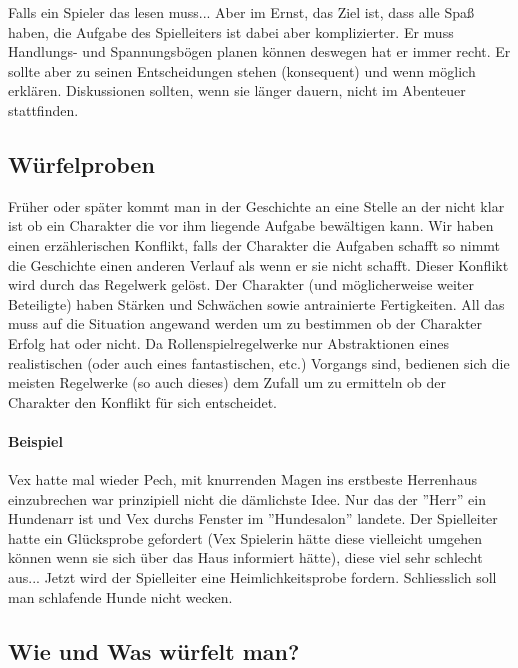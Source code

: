 \documentclass{article}
\begin{document}
Falls ein Spieler das lesen muss... Aber im Ernst, das Ziel ist, dass alle Spaß haben, die Aufgabe des Spielleiters ist
dabei aber komplizierter. Er muss Handlungs- und Spannungsbögen planen können deswegen hat er immer recht. Er sollte
aber zu seinen Entscheidungen stehen (konsequent) und wenn möglich erklären. Diskussionen sollten, wenn sie länger
dauern, nicht im Abenteuer stattfinden.

\begin{center}
\section{Würfelproben}
\end{center}

Früher oder später kommt man in der Geschichte an eine Stelle an der nicht klar ist ob ein Charakter die vor ihm
liegende Aufgabe bewältigen kann. Wir haben einen erzählerischen Konflikt, falls der Charakter die Aufgaben schafft
so nimmt die Geschichte einen anderen Verlauf als wenn er sie nicht schafft. Dieser Konflikt wird durch das Regelwerk
gelöst. Der Charakter (und möglicherweise weiter Beteiligte) haben Stärken und Schwächen sowie antrainierte
Fertigkeiten. All das muss auf die Situation angewand werden um zu bestimmen ob der Charakter Erfolg hat oder nicht.
Da Rollenspielregelwerke nur Abstraktionen eines realistischen (oder auch eines fantastischen, etc.) Vorgangs sind,
bedienen sich die meisten Regelwerke (so auch dieses) dem Zufall um zu ermitteln ob der Charakter den Konflikt für
sich entscheidet.

\paragraph{Beispiel}

Vex hatte mal wieder Pech, mit knurrenden Magen ins erstbeste Herrenhaus einzubrechen war prinzipiell nicht die
dämlichste Idee. Nur das der ''Herr'' ein Hundenarr ist und Vex durchs Fenster im ''Hundesalon'' landete.
Der Spielleiter hatte ein Glücksprobe gefordert (Vex Spielerin hätte diese vielleicht umgehen können wenn sie sich
über das Haus informiert hätte), diese viel sehr schlecht aus... Jetzt wird der Spielleiter eine Heimlichkeitsprobe
fordern. Schliesslich soll man schlafende Hunde nicht wecken.

\begin{center}
\subsection{Wie und Was würfelt man?}
\end{center}
\end{document}
